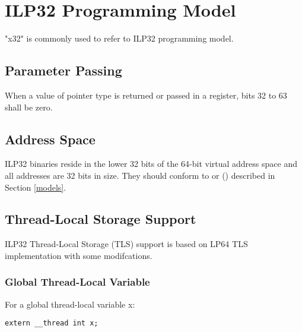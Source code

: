 \chapter{ILP32 Programming Model\label{x32}}

"x32" is commonly used to refer to \xARCH ILP32 programming model.

\section{Parameter Passing}
When a value of pointer type is returned or passed in a register, bits 32
to 63 shall be zero.

\section{Address Space}

ILP32 binaries reside in the lower 32 bits of the 64-bit virtual
address space and all addresses are 32 bits in size.  They should conform
to  or
 ()
described in Section \ref{models}.

\section{Thread-Local Storage Support}

ILP32 Thread-Local Storage (TLS) support is based on LP64 TLS
implementation with some modifcations.

\subsection{Global Thread-Local Variable}

For a global thread-local variable x:

\begin{verbatim}
extern __thread int x;
\end{verbatim}


